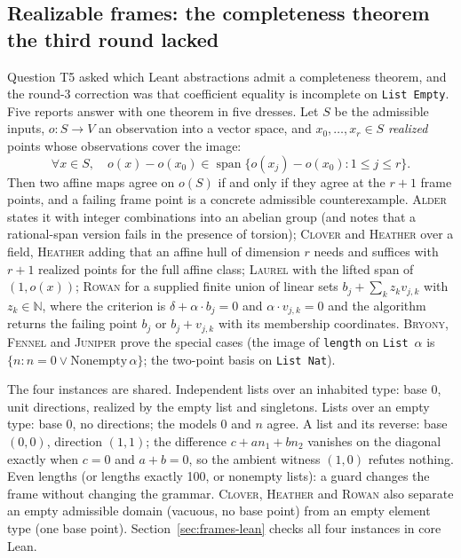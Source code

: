 \documentclass[11pt,a4paper]{article}
\newcommand{\code}[1]{\nolinkurl{#1}}
\newcommand{\Al}{\textsc{Alder}}
\newcommand{\Br}{\textsc{Bryony}}
\newcommand{\Cl}{\textsc{Clover}}
\newcommand{\Fe}{\textsc{Fennel}}
\newcommand{\He}{\textsc{Heather}}
\newcommand{\Ju}{\textsc{Juniper}}
\newcommand{\La}{\textsc{Laurel}}
\newcommand{\Ro}{\textsc{Rowan}}
\newcommand{\N}{\mathbb N}
\theoremstyle{definition}
\theoremstyle{plain}
\begin{document}
\subsection{Realizable frames: the completeness theorem the third round lacked}\label{sec:frames}
Question T5 asked which Leant abstractions admit a completeness theorem, and the round-3 correction was that coefficient equality is incomplete on \code{List Empty}. Five reports answer with one theorem in five dresses. Let $S$ be the admissible inputs, $o:S\to V$ an observation into a vector space, and $x_0,\ldots,x_r\in S$ \emph{realized} points whose observations cover the image:
\begin{equation}\label{eq:frame}
 \forall x\in S,\quad o(x)-o(x_0)\in\operatorname{span}\{o(x_j)-o(x_0):1\le j\le r\}.
\end{equation}
Then two affine maps agree on $o(S)$ if and only if they agree at the $r+1$ frame points, and a failing frame point is a concrete admissible counterexample. \Al{} states it with integer combinations into an abelian group (and notes that a rational-span version fails in the presence of torsion); \Cl{} and \He{} over a field, \He{} adding that an affine hull of dimension $r$ needs and suffices with $r+1$ realized points for the full affine class; \La{} with the lifted span of $(1,o(x))$; \Ro{} for a supplied finite union of linear sets $b_j+\sum_k z_kv_{j,k}$ with $z_k\in\N$, where the criterion is $\delta+\alpha\cdot b_j=0$ and $\alpha\cdot v_{j,k}=0$ and the algorithm returns the failing point $b_j$ or $b_j+v_{j,k}$ with its membership coordinates. \Br, \Fe{} and \Ju{} prove the special cases (the image of \code{length} on \code{List}~$\alpha$ is $\{n:n=0\lor\mathrm{Nonempty}\,\alpha\}$; the two-point basis on \code{List Nat}).

The four instances are shared. Independent lists over an inhabited type: base $0$, unit directions, realized by the empty list and singletons. Lists over an empty type: base $0$, no directions; the models $0$ and $n$ agree. A list and its reverse: base $(0,0)$, direction $(1,1)$; the difference $c+an_1+bn_2$ vanishes on the diagonal exactly when $c=0$ and $a+b=0$, so the ambient witness $(1,0)$ refutes nothing. Even lengths (or lengths exactly 100, or nonempty lists): a guard changes the frame without changing the grammar. \Cl, \He{} and \Ro{} also separate an empty admissible domain (vacuous, no base point) from an empty element type (one base point). Section~\ref{sec:frames-lean} checks all four instances in core Lean.
\end{document}
